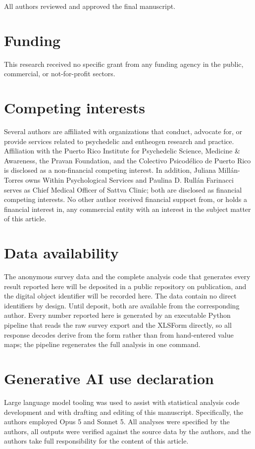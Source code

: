 \documentclass[12pt]{article}
\begin{document}
\noindent All authors reviewed and approved the final manuscript.

\section*{Funding}
This research received no specific grant from any funding agency in the public, commercial, or
not-for-profit sectors.

\section*{Competing interests}
Several authors are affiliated with organizations that conduct, advocate for, or provide services related
to psychedelic and entheogen research and practice. Affiliation with the Puerto Rico Institute for
Psychedelic Science, Medicine \& Awareness, the Pravan Foundation, and the Colectivo Psicod\'elico de
Puerto Rico is disclosed as a non-financial competing interest. In addition, Juliana Mill\'an-Torres owns
Within Psychological Services and Paulina D. Rull\'an Farinacci serves as Chief Medical Officer of Sattva
Clinic; both are disclosed as financial competing interests. No other author received financial support
from, or holds a financial interest in, any commercial entity with an interest in the subject matter of
this article.

\section*{Data availability}
The anonymous survey data and the complete analysis code that generates every result reported here will
be deposited in a public repository on publication, and the digital object identifier will be recorded
here. The data contain no direct identifiers by design. Until deposit, both are available from the
corresponding author. Every number reported here is generated by an executable Python pipeline that reads
the raw survey export and the XLSForm directly, so all response decodes derive from the form rather than
from hand-entered value maps; the pipeline regenerates the full analysis in one command.

\section*{Generative AI use declaration}
Large language model tooling was used to assist with statistical analysis code development and with
drafting and editing of this manuscript. Specifically, the authors employed Opus 5 and Sonnet 5. All analyses were specified by the authors, all outputs were
verified against the source data by the authors, and the authors take full responsibility for the content
of this article.
\end{document}
